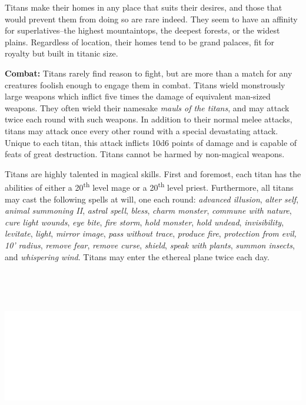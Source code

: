 \begin{multicols}{2}
Titans make their homes in any place that suits their desires, and those that would prevent them from doing so are rare indeed. They seem to have an affinity for superlatives--the highest mountaintops, the deepest forests, or the widest plains. Regardless of location, their homes tend to be grand palaces, fit for royalty but built in titanic size.

\textbf{Combat:} Titans rarely find reason to fight, but are more than a match for any creatures foolish enough to engage them in combat. Titans wield monstrously large weapons which inflict five times the damage of equivalent man-sized weapons. They often wield their namesake \textit{mauls of the titans}, and may attack twice each round with such weapons. In addition to their normal melee attacks, titans may attack once every other round with a special devastating attack. Unique to each titan, this attack inflicts 10d6 points of damage and is capable of feats of great destruction. Titans cannot be harmed by non-magical weapons.

Titans are highly talented in magical skills. First and foremost, each titan has the abilities of either a 20\textsuperscript{th} level mage or a 20\textsuperscript{th} level priest. Furthermore, all titans may cast the following spells at will, one each round: \textit{advanced illusion}, \textit{alter self}, \textit{animal summoning II}, \textit{astral spell}, \textit{bless}, \textit{charm monster}, \textit{commune with nature}, \textit{cure light wounds}, \textit{eye bite}, \textit{fire storm}, \textit{hold monster}, \textit{hold undead}, \textit{invisibility}, \textit{levitate}, \textit{light}, \textit{mirror image}, \textit{pass without trace}, \textit{produce fire}, \textit{protection from evil, 10' radius}, \textit{remove fear}, \textit{remove curse}, \textit{shield}, \textit{speak with plants}, \textit{summon insects}, and \textit{whispering wind}. Titans may enter the ethereal plane twice each day.

\noindent\includegraphics[width=\columnwidth, height=3in]{testblock.pdf}


\end{multicols}
